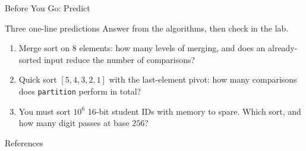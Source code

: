 \documentclass[aspectratio=169]{beamer}
\begin{document}
\begin{frame}{Before You Go: Predict}
  \begin{block}{Three one-line predictions}
    Answer from the algorithms, then check in the lab.
  \end{block}
  \begin{enumerate}
    \item Merge sort on $8$ elements: how many levels of merging, and does an
      already-sorted input reduce the number of comparisons?
    \item Quick sort $[5,4,3,2,1]$ with the last-element pivot: how many
      comparisons does \texttt{partition} perform in total?
    \item You must sort $10^6$ 16-bit student IDs with memory to spare. Which
      sort, and how many digit passes at base $256$?
  \end{enumerate}
\end{frame}

\begin{frame}[allowframebreaks]{References}
  \tiny
  
  
\end{frame}
\end{document}
